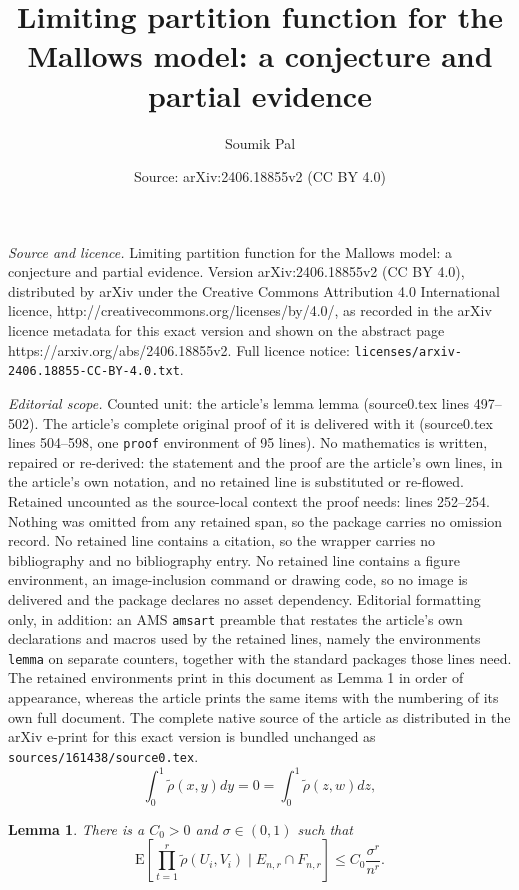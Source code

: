 \documentclass[10pt,a4paper]{amsart}
\title{Limiting partition function for the Mallows model: a conjecture and partial evidence}
\author{Soumik Pal}
\date{Source: arXiv:2406.18855v2 (CC BY 4.0)}
\newtheorem{lemma}{Lemma}
\newcommand{\E}{\mathrm{E}}
\begin{document}
\maketitle

\noindent\emph{Source and licence.} Limiting partition function for the Mallows model: a conjecture and partial evidence. Version arXiv:2406.18855v2 (CC BY 4.0), distributed by arXiv under the Creative Commons Attribution 4.0 International licence, http://creativecommons.org/licenses/by/4.0/, as recorded in the arXiv licence metadata for this exact version and shown on the abstract page https://arxiv.org/abs/2406.18855v2. Full licence notice: \texttt{licenses/arxiv-2406.18855-CC-BY-4.0.txt}.\par\smallskip

\noindent\textit{Editorial scope.} Counted unit: the article's lemma lemma (source0.tex lines 497--502). The article's complete original proof of it is delivered with it (source0.tex lines 504--598, one \texttt{proof} environment of 95 lines). No mathematics is written, repaired or re-derived: the statement and the proof are the article's own lines, in the article's own notation, and no retained line is substituted or re-flowed.  Retained uncounted as the source-local context the proof needs: lines 252--254.  Nothing was omitted from any retained span, so the package carries no omission record.  No retained line contains a citation, so the wrapper carries no bibliography and no bibliography entry.  No retained line contains a figure environment, an image-inclusion command or drawing code, so no image is delivered and the package declares no asset dependency.  Editorial formatting only, in addition: an AMS \texttt{amsart} preamble that restates the article's own declarations and macros used by the retained lines, namely the environments \texttt{lemma} on separate counters, together with the standard packages those lines need.  The retained environments print in this document as Lemma 1 in order of appearance, whereas the article prints the same items with the numbering of its own full document.  The complete native source of the article as distributed in the arXiv e-print for this exact version is bundled unchanged as \texttt{sources/161438/source0.tex}.
\begin{equation}\label{eqn:marginal}
    \int_0^1 \tilde{\rho}(x,y)dy=0=\int_0^1 \tilde{\rho}(z,w)dz, 
\end{equation}

\begin{lemma}
There is a $C_0>0$ and $\sigma \in (0,1)$ such that 
\[
\E\left[ \prod_{t=1}^r \tilde{\rho}(U_{i}, V_i) \mid E_{n,r} \cap F_{n,r} \right] \le C_0 \frac{\sigma^r}{n^r}. 
\]
\end{lemma}
\end{document}
